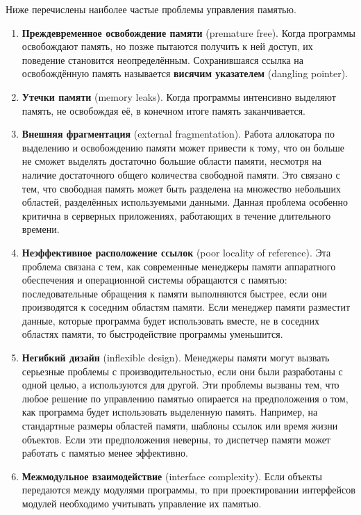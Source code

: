 Ниже перечислены наиболее частые проблемы управления памятью.~\cite{mm_overview}

\begin{enumerate}[label*=\arabic*.]
	\item \textbf{Преждевременное освобождение памяти} (premature free). 
	Когда программы освобождают память, но позже пытаются получить к ней доступ, их поведение становится неопределённым. Сохранившаяся ссылка на освобождённую память называется \textbf{висячим указателем} (dangling pointer).
	\item \textbf{Утечки памяти} (memory leaks). Когда программы интенсивно выделяют память, не освобождая её, в конечном итоге память заканчивается.
	\item \textbf{Внешняя фрагментация} (external fragmentation). Работа аллокатора по выделению и освобождению памяти может привести к тому, что он больше не сможет выделять достаточно большие области памяти, несмотря на наличие достаточного общего количества свободной памяти. Это связано с тем, что свободная память может быть разделена на множество небольших областей, разделённых используемыми данными. Данная проблема особенно критична в серверных приложениях, работающих в течение длительного времени.
	\item \textbf{Неэффективное расположение ссылок} (poor locality of reference). Эта проблема связана с тем, как современные менеджеры памяти аппаратного обеспечения и операционной системы обращаются с памятью: последовательные обращения к памяти выполняются быстрее, если они производятся к соседним областям памяти. Если менеджер памяти разместит данные, которые программа будет использовать вместе, не в соседних областях памяти, то быстродействие программы уменьшится.
	\item \textbf{Негибкий дизайн} (inflexible design). Менеджеры памяти могут вызвать серьезные проблемы с производительностью, если они были разработаны с одной целью, а используются для другой. Эти проблемы вызваны тем, что любое решение по управлению памятью опирается на предположения о том, как программа будет использовать выделенную память. Например, на стандартные размеры областей памяти, шаблоны ссылок или время жизни объектов. Если эти предположения неверны, то диспетчер памяти может работать с памятью менее эффективно.
	\item \textbf{Межмодульное взаимодействие} (interface complexity). Если объекты передаются между модулями программы, то при проектировании интерфейсов модулей необходимо учитывать управление их памятью.
\end{enumerate}

